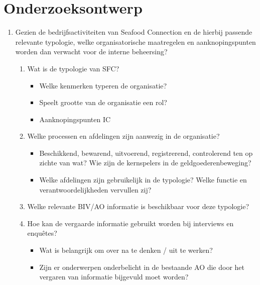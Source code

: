 \documentclass[10pt,a4paper,oneside]{report}
\begin{document}
\chapter{Onderzoeksontwerp}


\begin{enumerate}
    \item Gezien de bedrijfsactiviteiten van Seafood Connection en de hierbij passende relevante typologie, welke organisatorische maatregelen en aanknopingspunten worden dan verwacht voor de interne beheersing?
    \begin{enumerate}
        \item Wat is de typologie van SFC? 
        \begin{itemize}
            \item Welke kenmerken typeren de organisatie?
            \item Speelt grootte van de organisatie een rol?
            \item Aanknopingspunten IC
        \end{itemize}
        \item Welke processen en afdelingen zijn aanwezig in de organisatie?
        \begin{itemize}
            \item Beschikkend, bewarend, uitvoerend, registrerend, controlerend ten op zichte van wat? Wie zijn de kernspelers in de geldgoederenbeweging?
            \item Welke afdelingen zijn gebruikelijk in de typologie? Welke functie en verantwoordelijkheden vervullen zij?
        \end{itemize}
        \item Welke relevante BIV/AO informatie is beschikbaar voor deze typologie?
        \item Hoe kan de vergaarde informatie gebruikt worden bij interviews en enquêtes?
        \begin{itemize}
            \item Wat is belangrijk om over na te denken / uit te werken?
            \item Zijn er onderwerpen onderbelicht in de bestaande AO die door het vergaren van informatie bijgevuld moet worden?
        \end{itemize}
    \end{enumerate}
\end{enumerate}
\end{document}
